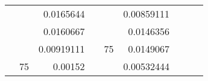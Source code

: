 \begin{table}[H]
\begin{tabular}{|ccrccrccc}
\multicolumn{1}{|c|}{\cellcolor[HTML]{FFFFC7}}                                & \multicolumn{1}{c|}{\cellcolor[HTML]{DAE8FC}}                      & \multicolumn{1}{r|}{\cellcolor[HTML]{DAE8FC}0.0165644}   & \multicolumn{1}{c|}{\cellcolor[HTML]{FFFFC7}}                                & \multicolumn{1}{c|}{\cellcolor[HTML]{DAE8FC}}                       & \multicolumn{1}{r|}{\cellcolor[HTML]{DDFDFF}0.00859111}  &                                                                              &                                                                    &                                                          \\ \cline{3-3} \cline{6-6}
\multicolumn{1}{|c|}{\cellcolor[HTML]{FFFFC7}}                                & \multicolumn{1}{c|}{\cellcolor[HTML]{DAE8FC}}                      & \multicolumn{1}{r|}{\cellcolor[HTML]{DDFDFF}0.0160667}   & \multicolumn{1}{c|}{\cellcolor[HTML]{FFFFC7}}                                & \multicolumn{1}{c|}{\cellcolor[HTML]{DAE8FC}}                       & \multicolumn{1}{r|}{\cellcolor[HTML]{DAE8FC}0.0146356}   &                                                                              &                                                                    &                                                          \\ \cline{3-3} \cline{6-6}
\multicolumn{1}{|c|}{\cellcolor[HTML]{FFFFC7}}                                & \multicolumn{1}{c|}{\cellcolor[HTML]{DAE8FC}}                      & \multicolumn{1}{r|}{\cellcolor[HTML]{DAE8FC}0.00919111}  & \multicolumn{1}{c|}{\cellcolor[HTML]{FFFFC7}}                                & \multicolumn{1}{c|}{\multirow{-10}{*}{\cellcolor[HTML]{DAE8FC}75}}  & \multicolumn{1}{r|}{\cellcolor[HTML]{DDFDFF}0.0149067}   &                                                                              &                                                                    &                                                          \\ \cline{3-3} \cline{5-6}
\multicolumn{1}{|c|}{\cellcolor[HTML]{FFFFC7}}                                & \multicolumn{1}{c|}{\multirow{-10}{*}{\cellcolor[HTML]{DAE8FC}75}} & \multicolumn{1}{r|}{\cellcolor[HTML]{DDFDFF}0.00152}     & \multicolumn{1}{c|}{\cellcolor[HTML]{FFFFC7}}                                & \multicolumn{1}{c|}{\cellcolor[HTML]{DDFDFF}}                       & \multicolumn{1}{r|}{\cellcolor[HTML]{DAE8FC}0.00532444}  &                                                                              &                                                                    &                                                          \\ \cline{2-3} \cline{6-6}

\end{tabular}
\end{table}
